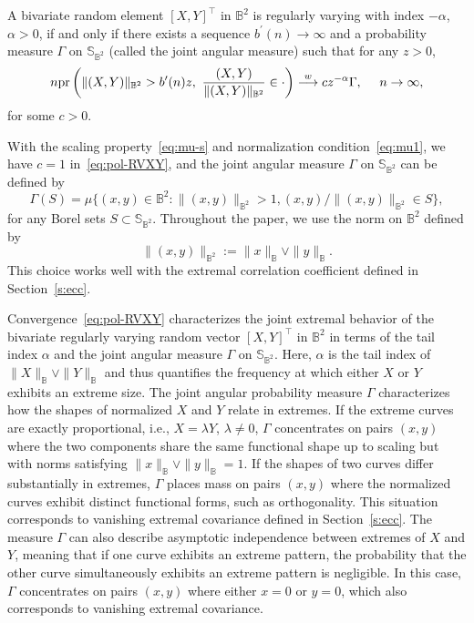 \documentclass[lineno]{biometrika}
\newcommand \ag{\alpha}
\newcommand \Gg{\Gamma}
\newcommand \la{\lambda}
\newcommand\mbB{{\mathbb B}}
\newcommand\mbS{{\mathbb S}}
\newcommand\lp{\left (}
\newcommand\rp{\right )}
\begin{document}
\begin{lemma} \label{l:BiRV}
A bivariate random element $[X,Y]^{\top}$ in $\mbB^2$ is regularly varying with index $-\ag$, $\ag>0$, if and only if there exists a sequence $b^{\prime}(n) \to \infty$ and a probability measure $\Gg$ on $\mbS_{\mbB^2}$ (called the joint angular measure) such that for any $z>0$,
\begin{equation} \label{eq:pol-RVXY}
n{\rm pr} \lp   \|(X, Y)\|_{\mbB^2}    >b^{\prime}(n)z,
\ \frac{(X,Y)}{\|(X, Y)\|_{\mbB^2}}
  \in \cdot \rp
\stackrel{w}{\longrightarrow} c z^{-\ag}\Gg, \ \ \ \ n \to \infty,
\end{equation}
for some $c>0$.
\end{lemma}

With the scaling property~\eqref{eq:mu-s} and normalization condition~\eqref{eq:mu1}, we have $c=1$ in~\eqref{eq:pol-RVXY}, and the joint angular measure $\Gg$ on $\mbS_{\mbB^2}$ can be defined by
\begin{equation} \label{eq:Gg}
\Gg(S) = \mu\{(x,y) \in \mbB^2: \|(x,y)\|_{\mbB^2} >1, (x,y)/\|(x,y)\|_{\mbB^2} \in S\},
\end{equation}
for any Borel sets $S \subset \mbS_{\mbB^2}$. Throughout the paper, we use the norm on $\mbB^2$ defined by
\[
\|(x,y)\|_{\mbB^2} := \|x\|_{\mbB} \vee \|y\|_{\mbB}.
\]
This choice works well with the extremal correlation coefficient defined in Section~\ref{s:ecc}.

Convergence~\eqref{eq:pol-RVXY} characterizes the joint extremal behavior of the bivariate regularly varying random vector $[X,Y]^{\top}$ in $\mbB^2$ in terms of the tail index $\ag$ and the joint angular measure $\Gg$ on $\mbS_{\mbB^2}$. Here, $\ag$ is the tail index of $\|X\|_{\mbB} \vee \|Y\|_{\mbB}$
and thus quantifies the frequency at which either $X$ or $Y$ exhibits an extreme size. The joint angular probability measure $\Gg$ characterizes how the shapes of normalized $X$ and $Y$ relate in extremes. If the extreme curves are exactly proportional, i.e., $X=\la Y$, $\la \neq 0$, $\Gg$ concentrates on pairs $(x,y)$ where the two components share the same functional shape up to scaling but with norms satisfying $\|x\|_{\mbB} \vee \|y\|_{\mbB}=1$. If the shapes of two curves differ substantially in extremes, $\Gg$ places mass on pairs
$(x,y)$ where the normalized curves exhibit distinct functional forms,
such as orthogonality. This situation corresponds to vanishing
extremal covariance defined in Section~\ref{s:ecc}.
The measure $\Gg$ can also describe asymptotic independence
between extremes of $X$ and $Y$, meaning that if one curve exhibits
an extreme pattern, the probability that the other curve simultaneously
exhibits an extreme pattern is negligible. In this case, $\Gg$
concentrates on pairs $(x,y)$ where either $x = 0$ or $y = 0$,
which also corresponds to vanishing extremal covariance.
\end{document}
